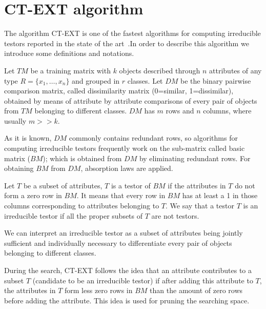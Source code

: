 \documentclass[authoryear,preprint,review,12pt]{elsarticle}
\begin{document}
\section{CT-EXT algorithm}
\label{sect:2}
The algorithm CT-EXT is one of the fastest algorithms for computing irreducible testors reported in the 
state of the art~\citep{R22,R23,Piza13}.In order to describe this algorithm we introduce some definitions 
and notations.


Let $TM$ be a training matrix with $k$ objects described through $n$
attributes of any type $R=\{x_{1},\ldots,x_{n}\}$ and grouped in $r$
classes. Let $DM$ be the binary pairwise comparison matrix, called dissimilarity matrix 
(0=similar, 1=dissimilar), obtained by means of attribute by attribute comparisons of every
pair of objects from $TM$ belonging to different classes. $DM$ has
$m$ rows and $n$ columns, where usually $m>>k$.

As it is known, $DM$ commonly contains redundant rows, so algorithms
for computing irreducible testors frequently work on the sub-matrix called basic matrix ($BM$);
which is obtained from $DM$ by eliminating redundant rows. For obtaining
$BM$ from $DM$, absorption laws are applied.

Let $T$ be a subset of attributes, $T$ is a testor of $BM$ if the attributes in $T$ do not form a zero row 
in $BM$. It means that every row in $BM$ has at least a 1 in those columns corresponding to attributes 
belonging to $T$. We say that a testor $T$ is an irreducible testor if all the proper subsets of $T$ are not testors.

We can interpret an irreducible testor as a subset of attributes being jointly sufficient and individually necessary
to differentiate every pair of objects belonging to different classes.


During the search, CT-EXT follows the idea that an attribute contributes to a subset $T$ (candidate to 
be an irreducible testor) if after adding this attribute to $T$, the attributes in $T$ form less zero rows in $BM$ than 
the amount of zero rows before adding the attribute. This idea is used for pruning the searching space.
\end{document}
